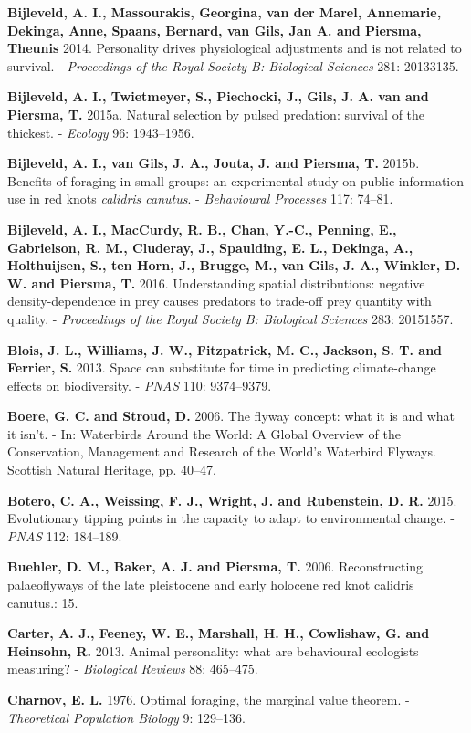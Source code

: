 \documentclass[]{scrartcl}
\begin{document}
\begin{multicols}{2}
\textbf{Bijleveld, A. I., Massourakis, Georgina, van der Marel,
Annemarie, Dekinga, Anne, Spaans, Bernard, van Gils, Jan A. and Piersma,
Theunis} 2014. Personality drives physiological adjustments and is not
related to survival. - \emph{Proceedings of the Royal Society B:
Biological Sciences} 281: 20133135.

\textbf{Bijleveld, A. I., Twietmeyer, S., Piechocki, J., Gils, J. A. van
and Piersma, T.} 2015a. Natural selection by pulsed predation: survival
of the thickest. - \emph{Ecology} 96: 1943--1956.

\textbf{Bijleveld, A. I., van Gils, J. A., Jouta, J. and Piersma, T.}
2015b. Benefits of foraging in small groups: an experimental study on
public information use in red knots \emph{calidris canutus}. -
\emph{Behavioural Processes} 117: 74--81.

\textbf{Bijleveld, A. I., MacCurdy, R. B., Chan, Y.-C., Penning, E.,
Gabrielson, R. M., Cluderay, J., Spaulding, E. L., Dekinga, A.,
Holthuijsen, S., ten Horn, J., Brugge, M., van Gils, J. A., Winkler, D.
W. and Piersma, T.} 2016. Understanding spatial distributions: negative
density-dependence in prey causes predators to trade-off prey quantity
with quality. - \emph{Proceedings of the Royal Society B: Biological
Sciences} 283: 20151557.

\textbf{Blois, J. L., Williams, J. W., Fitzpatrick, M. C., Jackson, S.
T. and Ferrier, S.} 2013. Space can substitute for time in predicting
climate-change effects on biodiversity. - \emph{PNAS} 110: 9374--9379.

\textbf{Boere, G. C. and Stroud, D.} 2006. The flyway concept: what it
is and what it isn't. - In: Waterbirds Around the World: A Global
Overview of the Conservation, Management and Research of the World's
Waterbird Flyways. Scottish Natural Heritage, pp. 40--47.

\textbf{Botero, C. A., Weissing, F. J., Wright, J. and Rubenstein, D.
R.} 2015. Evolutionary tipping points in the capacity to adapt to
environmental change. - \emph{PNAS} 112: 184--189.

\textbf{Buehler, D. M., Baker, A. J. and Piersma, T.} 2006.
Reconstructing palaeoflyways of the late pleistocene and early holocene
red knot calidris canutus.: 15.

\textbf{Carter, A. J., Feeney, W. E., Marshall, H. H., Cowlishaw, G. and
Heinsohn, R.} 2013. Animal personality: what are behavioural ecologists
measuring? - \emph{Biological Reviews} 88: 465--475.

\textbf{Charnov, E. L.} 1976. Optimal foraging, the marginal value theorem. - \emph{Theoretical Population Biology} 9: 129–136.


\end{multicols}
\end{document}
